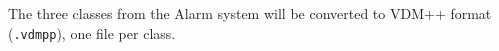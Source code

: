 The three classes from the Alarm system will be converted to VDM++ format (\texttt{.vdmpp}), one file per class.



%


%

